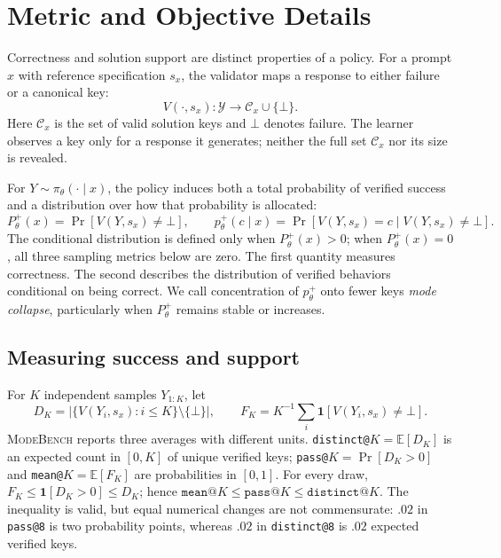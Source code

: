 \documentclass{article}
\newcommand{\1}{\mathbf 1}
\newcommand{\E}{\mathbb E}
\newcommand{\mb}{\textsc{ModeBench}}
\theoremstyle{remark}
\theoremstyle{definition}
\theoremstyle{plain}
\begin{document}
\appendix
\onecolumn
\raggedbottom

\section{Metric and Objective Details}
\label{app:metric-details}

Correctness and solution support are distinct properties of a policy. For a
prompt $x$ with reference specification $s_x$, the validator maps a response
to either failure or a canonical key:
\[
  V(\cdot,s_x):\mathcal Y\rightarrow \mathcal C_x\cup\{\bot\}.
\]
Here $\mathcal C_x$ is the set of valid solution keys and $\bot$ denotes
failure. The learner observes a key only for a response it generates; neither
the full set $\mathcal C_x$ nor its size is revealed.

For $Y\sim\pi_\theta(\cdot\mid x)$, the policy induces both a total probability
of verified success and a distribution over how that probability is allocated:
\[
 P_\theta^+(x)=\Pr[V(Y,s_x)\neq\bot],
 \qquad
 p_\theta^+(c\mid x)=\Pr[V(Y,s_x)=c\mid V(Y,s_x)\neq\bot].
\]
The conditional distribution is defined only when $P_\theta^+(x)>0$;
when $P_\theta^+(x)=0$, all three sampling metrics below are zero.
The first quantity measures correctness. The second describes the distribution
of verified behaviors conditional on being correct. We call concentration of
$p_\theta^+$ onto fewer keys \emph{mode collapse}, particularly when
$P_\theta^+$ remains stable or increases.

\subsection{Measuring success and support}
\label{app:metric-sampling}

For $K$ independent samples $Y_{1:K}$, let
\[
  D_K=\bigl|\{V(Y_i,s_x):i\le K\}\setminus\{\bot\}\bigr|,
  \qquad
  F_K=K^{-1}\sum_i \1[V(Y_i,s_x)\neq\bot].
\]
\mb{} reports three averages with different units. \texttt{distinct@}$K
=\E[D_K]$ is an expected count in $[0,K]$ of unique verified keys;
\texttt{pass@}$K=\Pr[D_K>0]$ and \texttt{mean@}$K=\E[F_K]$ are probabilities
in $[0,1]$. For every draw, $F_K\le\1[D_K>0]\le D_K$; hence
$\texttt{mean@}K\le\texttt{pass@}K\le\texttt{distinct@}K$. The inequality is
valid, but equal numerical changes are not commensurate: $.02$ in
\texttt{pass@8} is two probability points, whereas $.02$ in
\texttt{distinct@8} is $.02$ expected verified keys.
\end{document}
